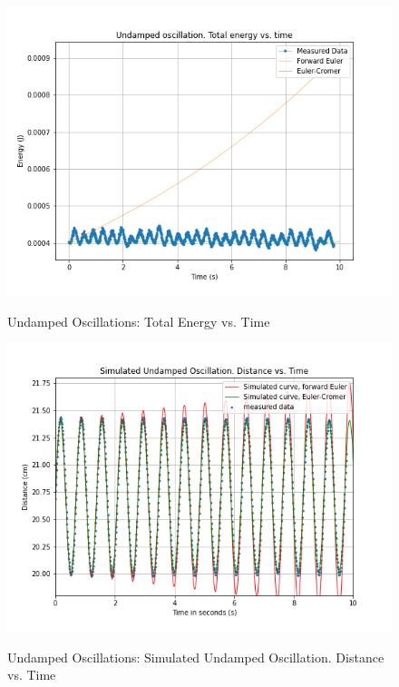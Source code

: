 \documentclass[letterpaper,12pt]{article}
\begin{document}
\begin{figure}[H]
  \centering
  \includegraphics[width=0.95\linewidth]{../Fredrik/Undamped oscillation. Total energy vs. time.png}    
  \begin{center}
    \emph{}
  \end{center}
  \caption{Undamped Oscillations: Total Energy vs. Time}
  \label{undamped-e-t-plot}
\end{figure}

\begin{figure}[H]
  \centering
  \includegraphics[width=0.95\linewidth]{../Fredrik/Simulated Undamped Oscillation. Distance vs. Time.png}    
  \begin{center}
    \emph{}
  \end{center}
  \caption{Undamped Oscillations: Simulated Undamped Oscillation. Distance vs. Time}
  \label{undamped-sim-d-t-plot}
\end{figure}
\end{document}
